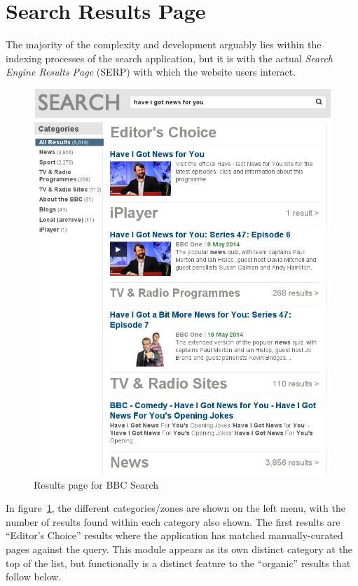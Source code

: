 \section{Search Results Page}
\label{sec:search-results-page}

The majority of the complexity and development arguably lies within
the indexing processes of the search application, but it is with the actual
\emph{Search Engine Results Page} (SERP) with which the website users interact.

\begin{figure}
  \begin{center}
    \includegraphics[width=\linewidth]{results-page.png}
  \end{center}
  \caption{Results page for BBC Search}
  \label{fig:search-page}
\end{figure}

In figure~\ref{fig:search-page},
the different categories/zones are shown on the left menu, with the
number of results found within each category also shown. The first results
are ``Editor's Choice'' results where the application
has matched manually-curated pages against the query. This module appears
as its own distinct category at the top of the list, but functionally
is a distinct feature to the ``organic'' results that follow below.


